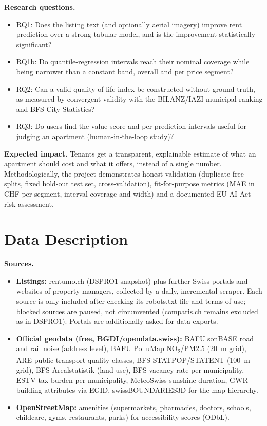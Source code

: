 \documentclass[11pt,a4paper]{article}
\begin{document}
\textbf{Research questions.}
\begin{itemize}
    \item RQ1: Does the listing text (and optionally aerial imagery) improve rent prediction over a strong tabular model, and is the improvement statistically significant?
    \item RQ1b: Do quantile-regression intervals reach their nominal coverage while being narrower than a constant band, overall and per price segment?
    \item RQ2: Can a valid quality-of-life index be constructed without ground truth, as measured by convergent validity with the BILANZ/IAZI municipal ranking and BFS City Statistics?
    \item RQ3: Do users find the value score and per-prediction intervals useful for judging an apartment (human-in-the-loop study)?
\end{itemize}

\textbf{Expected impact.} Tenants get a transparent, explainable estimate of what an apartment should cost and what it offers, instead of a single number. Methodologically, the project demonstrates honest validation (duplicate-free splits, fixed hold-out test set, cross-validation), fit-for-purpose metrics (MAE in CHF per segment, interval coverage and width) and a documented EU AI Act risk assessment.

\section{Data Description}

\textbf{Sources.}
\begin{itemize}
    \item \textbf{Listings:} rentumo.ch (DSPRO1 snapshot) plus further Swiss portals and websites of property managers, collected by a daily, incremental scraper. Each source is only included after checking its robots.txt file and terms of use; blocked sources are paused, not circumvented (comparis.ch remains excluded as in DSPRO1). Portals are additionally asked for data exports.
    \item \textbf{Official geodata (free, BGDI/opendata.swiss):} BAFU sonBASE road and rail noise (address level), BAFU PolluMap NO\textsubscript{2}/PM2.5 (20~m grid), ARE public-transport quality classes, BFS STATPOP/STATENT (100~m grid), BFS Arealstatistik (land use), BFS vacancy rate per municipality, ESTV tax burden per municipality, MeteoSwiss sunshine duration, GWR building attributes via EGID, swissBOUNDARIES3D for the map hierarchy.
    \item \textbf{OpenStreetMap:} amenities (supermarkets, pharmacies, doctors, schools, childcare, gyms, restaurants, parks) for accessibility scores (ODbL).
\end{itemize}
\end{document}
